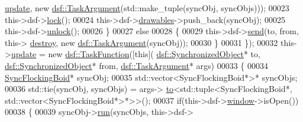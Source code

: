 \begin{DoxyCode}
      \hyperlink{class_flocking_boid_manager_a53cd9d7409eb6169290c4447c82c4906}{update}, \textcolor{keyword}{new} \hyperlink{classyc_1_1_any}{dsf::TaskArgument}(std::make\_tuple(syncObj, syncObjs)));
00023                                                  this->dsf->\hyperlink{classdsf_1_1_lock_ae521388d861fe66b9c6e2f09811b0d4b}{lock}();
00024                                                  this->dsf->\hyperlink{classdsf_1_1sfml_1_1_render_window_a745350dfdb1f752359f9055d714c453d}{drawables}->push\_back(syncObj);
00025                                                  this->dsf->\hyperlink{classdsf_1_1_lock_a3d03f801920d458b3c3c402a0f4af323}{unlock}();
00026                                              \}
00027                                              \textcolor{keywordflow}{else}
00028                                              \{
00029                                                  this->dsf->\hyperlink{classdsf_1_1_dual_state_framework_a3063d7f0ce537eb44dc2bdcec816a36b}{send}(to, from, this->
      \hyperlink{class_flocking_boid_manager_a71e9958bd298f68630681364bd0677f8}{destroy}, \textcolor{keyword}{new} \hyperlink{classyc_1_1_any}{dsf::TaskArgument}(syncObj));
00030                                              \}
00031                                          \});
00032     this->\hyperlink{class_flocking_boid_manager_a53cd9d7409eb6169290c4447c82c4906}{update} = \textcolor{keyword}{new} \hyperlink{namespacedsf_aa16e735f29587f4485b56fc46746f7a9}{dsf::TaskFunction}([\textcolor{keyword}{this}](
      \hyperlink{classdsf_1_1_synchronized_object}{dsf::SynchronizedObject}* to, \hyperlink{classdsf_1_1_synchronized_object}{dsf::SynchronizedObject}* from, 
      \hyperlink{classyc_1_1_any}{dsf::TaskArgument}* args)
00033                                          \{
00034                                              \hyperlink{class_sync_flocking_boid}{SyncFlockingBoid}* syncObj;
00035                                              std::vector<SyncFlockingBoid*>* syncObjs;
00036                                              std::tie(syncObj, syncObjs) = args->
      \hyperlink{classyc_1_1_any_a3db663604505ef8d7e84dd41d5bfcc75}{to}<std::tuple<SyncFlockingBoid*, std::vector<SyncFlockingBoid*>*>>();
00037                                              \textcolor{keywordflow}{if}(this->dsf->\hyperlink{classdsf_1_1sfml_1_1_render_window_a2c04b61ca1bfba140120001c4a9a30e1}{window}->isOpen())
00038                                              \{
00039                                                  syncObj->\hyperlink{class_sync_flocking_boid_a5756920e77254f47a358256f0c317716}{run}(syncObjs, this->dsf->

\end{DoxyCode}
